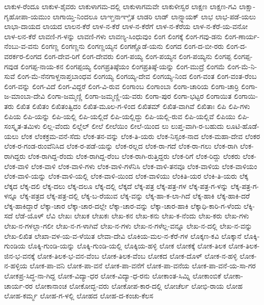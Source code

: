 ಲಾಕುಳ-ರೆಂದೂ
ಲಾಕುಳ-ಶೈವರು
ಲಾಕುಳಾಗಮ-ದಲ್ಲಿ
ಲಾಕುಳಾಗಮವೇ
ಲಾಕುಳೀಸ್ವರ
ಲಾಕ್ಷಣ
ಲಾಕ್ಷಣ-ಗವಿ
ಲಾಕ್ಷಾ-ಗೃಹೋಪಾ-ಯಮುಂ
ಲಾಗಾಯ್ತಿ-ನಿಂದಲೂ
ಲಾಞ್ಚನಾಞ್ಚಿತ
ಲಾಡರಿ
ಲಾಡ್
ಲಾನ್ಸ್ನಾಯಕ್
ಲಾಭ
ಲಾಭ-ಪಡೆ-ಯಲು
ಲಾಭಾ-ದಾಯದ
ಲಾಯದ
ಲಾಲನ-ಕೆರೆ
ಲಾಳ-ನ-ಕೆರೆ
ಲಾಳ-ನ-ಕೆರೆಗೆ
ಲಾಳ-ನ-ಕೆರೆಯ
ಲಾಳ-ನ-ಕೆರೆ-ಯ-ವನೋ
ಲಾಳ-ಲನ-ಕೆರೆ
ಲಾವಣಿ-ಗ-ಳನ್ನು
ಲಾವಣಿ-ಗಳು
ಲಾವಣ್ಯ-ಸಿಂಧುವುಂ
ಲಿಂಗ
ಲಿಂಗಕ್ಕೆ
ಲಿಂಗ-ಗವು-ಡನು
ಲಿಂಗ-ಣಾರ್ಯ-ನೆಂಬು-ವ-ವನು
ಲಿಂಗಣ್ಣ
ಲಿಂಗಣ್ಣನು
ಲಿಂಗಣ್ಣಯ್ಯನ
ಲಿಂಗಣ್ಣೊಡೆ-ಯನು
ಲಿಂಗದ
ಲಿಂಗ-ದ-ಬೀ-ರರು
ಲಿಂಗ-ದ-ವರರ್ಕರ-ಲಿಂಗದ
ಲಿಂಗ-ದೇವ-ರಿಗೆ
ಲಿಂಗ-ದೇವರು
ಲಿಂಗ-ಪಯ್ಯ
ಲಿಂಗ-ಪಯ್ಯನ
ಲಿಂಗ-ಪಯ್ಯನು
ಲಿಂಗಪ್ಪ
ಲಿಂಗಪ್ಪ-ಗವುಡ
ಲಿಂಗಪ್ಪ-ನಾಯ-ಕನ
ಲಿಂಗಪ್ಪಯ್ಯ
ಲಿಂಗಪ್ರತಿಷ್ಠೆಯಂ
ಲಿಂಗಪ್ರತಿಷ್ಠೆ-ಯನ್ನು
ಲಿಂಗ-ಮುದ್ರೆ
ಲಿಂಗಮೆ
ಲಿಂಗ-ಮೆ-ನಿ-ಸುವೆ
ಲಿಂಗ-ಮೆ-ನೆನಗಾಳ್ದನಾಪ್ತಬಾಂಧವ
ಲಿಂಗಯ್ಯ
ಲಿಂಗಯ್ಯ-ದೇವ
ಲಿಂಗಯ್ಯ-ನಿಂದ
ಲಿಂಗ-ವಂತ
ಲಿಂಗ-ವಂತ-ರೆಂಬ
ಲಿಂಗ-ವನ್ನು
ಲಿಂಗ-ವಿದೆ
ಲಿಂಗ-ವಿದ್ದರೆ
ಲಿಂಗ-ವಿ-ರುವ
ಲಿಂಗಾಂಬ
ಲಿಂಗಾಂಬಾ
ಲಿಂಗಾ-ಚಾರಿಯ
ಲಿಂಗಾ-ಚಾರ್ರಿ
ಲಿಂಗಾ-ಜ-ಮಾಂಬಾ-ದೇವಿ
ಲಿಂಗಾ-ಜಮ್ಮಣ್ಣಿ
ಲಿಂಗಾ-ಜಮ್ಮಣ್ಣಿ-ಯ-ವರು
ಲಿಂಗಾ-ಪುರ
ಲಿಂಗಾ-ಭಟ್ಟರ
ಲಿಂಗಾಯಿತ
ಲಿಂಗಾಯಿ-ತರು
ಲಿಖಿತ
ಲಿಖಿತಂ
ಲಿಖಿತಂತ್ವಿದಂ
ಲಿಖಿತ-ಮೂಲ-ಗ-ಳಿಂದ
ಲಿಖಿತಮ್
ಲಿಖಿತ-ವಾಗಿವೆ
ಲಿಖಿತಾಃ
ಲಿಪಿ
ಲಿಪಿ-ಗಳು
ಲಿಪಿಯ
ಲಿಪಿ-ಯನ್ನು
ಲಿಪಿ-ಯಲ್ಲಿ
ಲಿಪಿ-ಯಲ್ಲಿದೆ
ಲಿಪಿ-ಯಲ್ಲಿದ್ದು
ಲಿಪಿ-ಯಲ್ಲಿ-ರುವ
ಲಿಪಿ-ಯಲ್ಲಿವೆ
ಲಿಪಿಯು
ಲಿಪಿ-ಸಂಸ್ಕೃತ-ತಮಿಳು
ಲಿಲ್ಲ-ವೆಂದು
ಲಿಲ್ಲೆಲ್
ಲೀಲೆ
ಲೀಲೆಯಿಂ
ಲೀಲೆ-ಯಿಂದ
ಲು
ಲುಪ್ತ-ವಾಗಿ-ರ-ಬಹುದು
ಲೂಟಿ-ಹೊಡೆ-ಯಲು
ಲೆಂಕ
ಲೆಂಕಕ್ರಮ-ವನೆ-ಸೆದು
ಲೆಂಕ-ತನ-ವನ್ನು
ಲೆಂಕ-ತಿ-ಯರು
ಲೆಂಕ-ನಿಸ್ಸಂಕ-ನಾದ
ಲೆಂಕ-ಮಹಾ-ದೇವ
ಲೆಂಕರ
ಲೆಂಕ-ರ-ಗಂಡ-ರುಂವೆನಿಸಿದ
ಲೆಂಕ-ರ-ಪಡೆ-ಯನ್ನು
ಲೆಂಕ-ರಲ್ಲದ
ಲೆಂಕ-ರಾ-ಗದೆ
ಲೆಂಕ-ರಾ-ಗಲು
ಲೆಂಕ-ರಾಗಿ
ಲೆಂಕ-ರಾಗಿದ್ದರು
ಲೆಂಕ-ರಾಗಿದ್ದ-ರೆಂದು
ಲೆಂಕ-ರಾಗಿದ್ದ-ರೆಂಬ
ಲೆಂಕ-ರಾಗಿ-ರುತ್ತಿದ್ದರು
ಲೆಂಕ-ರಿಗೆ
ಲೆಂಕ-ರಿದ್ದು
ಲೆಂಕರು
ಲೆಂಕ-ಲೆಂಕ-ವಾಳಿ
ಲೆಂಕ-ವಾಳಿ
ಲೆಂಕ-ವಾಳಿ-ಗಳು
ಲೆಂಕ-ವಾಳಿ-ಗಳೆನಿಸಿ
ಲೆಂಕ-ವಾಳಿ-ತನವೂ
ಲೆಂಕ-ವಾಳಿಯ
ಲೆಂಕ-ವಾಳಿಯಂ
ಲೆಂಕ-ವಾಳಿ-ಯನ್ನು
ಲೆಂಕ-ವಾಳಿ-ಯಲ್ಲಿ
ಲೆಂಕ-ವಾಳಿ-ಯಿಂದ
ಲೆಂಕ-ವಾಳಿಯು
ಲೆಂಕಿತಿ-ಯರ
ಲೆಂಕಿ-ತಿ-ಯರು
ಲೆಕ್ಕ
ಲೆಕ್ಕದ
ಲೆಕ್ಕ-ದಲಿ
ಲೆಕ್ಕ-ದಲು
ಲೆಕ್ಕ-ದಲೂ
ಲೆಕ್ಕ-ದಲ್ಲಿ
ಲೆಕ್ಕದೆ
ಲೆಕ್ಕ-ಪತ್ರ
ಲೆಕ್ಕ-ಪತ್ರ-ಗಳ
ಲೆಕ್ಕ-ಪತ್ರ-ಗ-ಳನ್ನು
ಲೆಕ್ಕ-ಪತ್ರ-ಗ-ಳನ್ನೂ
ಲೆಕ್ಕ-ಪತ್ರದ
ಲೆಕ್ಕ-ಪತ್ರ-ದಲ್ಲಿ
ಲೆಕ್ಕ-ಬ-ರೆಯುವ
ಲೆಕ್ಕ-ವನ್ನು
ಲೆಕ್ಕ-ಹಾ-ಕ-ಲಾ-ಗಿದೆ
ಲೆಕ್ಕ-ಹಾಕಿ
ಲೆಕ್ಕ-ಹಾಕಿ-ದರೆ
ಲೆಕ್ಕ-ಹಾಕಿದ್ದಾರೆ
ಲೆಕ್ಕಾ-ಚಾರ
ಲೆಕ್ಕಾ-ಚಾರ-ದಲ್ಲೇ
ಲೆಕ್ಕಾ-ಚಾರ-ವನ್ನು
ಲೆಕ್ಕಾ-ಚಾರ-ಹಾಕಿ
ಲೆಕ್ಕಾಧಿ-ಕಾರಿ-ಗ-ಳೆಂದು
ಲೆಕ್ಕಿ-ಸದೆ
ಲೆಡೆ-ಯೊಳ್
ಲೆವಿ
ಲೇಖಃ
ಲೇಖಕ
ಲೇಖಕಃ
ಲೇಖ-ಕನ
ಲೇಖ-ಕನು
ಲೇಖ-ಕ-ನೆಂದು
ಲೇಖ-ಕರು
ಲೇಖ-ಗಳು
ಲೇಖ-ನ-ಗಳಲ್ಲಾ-ಗಲೀ
ಲೇಖ-ನ-ಗ-ಳಾಗಿವೆ
ಲೇಖ-ನ-ಗಳು
ಲೇಖ-ನ-ಗಳೆಲ್ಲ-ವನ್ನೂ
ಲೇಖ-ನ-ದಲ್ಲಿ
ಲೇಖ-ನ-ವನ್ನು
ಲೇಖ-ಲಿಖಿತ
ಲೇಖಾ-ವಳ-ಯ-ವ-ಳೆಯಿತ
ಲೇವಾ-ದೇವಿ
ಲೊಕಿಯ-ಮಲ-ನ-ಕೆರೆ-ಗಳ
ಲೊಕ್ಕಣ-ಕವಿ
ಲೊಕ್ಕಾನೆ
ಲೊಕ್ಕಿ-ಗುಂಡಿಯ
ಲೊಕ್ಕಿ-ಗುಂಡಿ-ಯನ್ನು
ಲೊಕ್ಕಿ-ಗುಂಡಿ-ಯಲ್ಲಿ
ಲೊಕ್ಕಿಯ-ಹಳ್ಳಿ
ಲೋಕ
ಲೋಕಕ್ಕೆ
ಲೋಕ-ತಿಲಕ
ಲೋಕ-ತಿಲಕ-ಜಿನ-ಭ-ವನಕ್ಕೆ
ಲೋಕ-ತಿಲಕ-ಭ-ವನ-ವೆಂಬ
ಲೋಕ-ತಿಲಕ-ವೆಂಬ
ಲೋಕದ
ಲೋಕ-ದೊಳ್
ಲೋಕ-ನ-ಹಳ್ಳಿ
ಲೋಕ-ನ-ಹಳ್ಳಿಯ
ಲೋಕ-ಪಾ-ವನಿ
ಲೋಕ-ಪಾ-ವನೆ
ಲೋಕ-ಪಾ-ವನೆಗೆ
ಲೋಕ-ಪಾ-ವನೆಯ
ಲೋಕ-ಪಾ-ವನೆ-ಯ-ಸಾ-ಗರ
ಲೋಕಪ್ರ-ಸಿದ್ಧ-ನಾ-ಗಿದ್ದ
ಲೋಕ-ವಿದ್ಯಾ-ಧರ
ಲೋಕ-ವಿದ್ಯಾ-ಧ-ರನು
ಲೋಕಾಂತ-ಸಿಮ್ನಿ
ಲೋಕಾಂಬಿಕೆ
ಲೋಕಾ-ಚಾರ್ಯ-ರರ
ಲೋಕಾನಾಂಚ
ಲೋಕೋದ್ಭ-ವರು
ಲೋಕೋಪ-ಕಾರ-ದಲ್ಲಿ
ಲೋಚೆರ್ಲ
ಲೋಭಿ-ರಾಯ
ಲೋಹ
ಲೋಹ-ಕರ್ಮ್ಮ
ಲೋಹ-ಗ-ಳಲ್ಲಿ
ಲೋಹದ
ಲೋಹ-ದ-ಕಂಚು-ಕೆಲಸ
